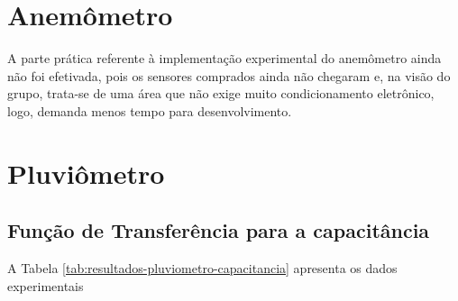 \documentclass[a4paper]{instrumentacao}
\begin{document}
\section{Anemômetro}

A parte prática referente à implementação experimental do anemômetro ainda não foi efetivada, pois os sensores comprados ainda não chegaram e, na visão do grupo, trata-se de uma área que não exige muito condicionamento eletrônico, logo, demanda menos tempo para desenvolvimento.

\section{Pluviômetro}
\subsection{Função de Transferência para a capacitância}

A Tabela \ref{tab:resultados-pluviometro-capacitancia} apresenta os dados experimentais 
\end{document}
